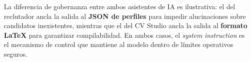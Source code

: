 \begin{AvisoNota}
La diferencia de gobernanza entre ambos asistentes de IA es ilustrativa: el del reclutador
ancla la salida al \textbf{JSON de perfiles} para impedir alucinaciones sobre candidatos
inexistentes, mientras que el del CV Studio ancla la salida al \textbf{formato LaTeX} para
garantizar compilabilidad. En ambos casos, el \textit{system instruction} es el mecanismo
de control que mantiene al modelo dentro de límites operativos seguros.
\end{AvisoNota}
